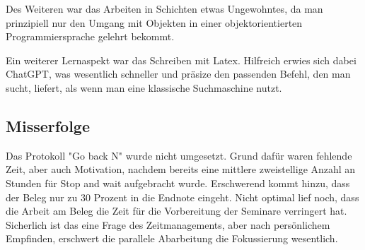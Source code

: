 \documentclass{article}
\begin{document}
Des Weiteren war das Arbeiten in Schichten etwas Ungewohntes, da man prinzipiell nur den Umgang mit Objekten in einer objektorientierten Programmiersprache gelehrt bekommt.  

Ein weiterer Lernaspekt war das Schreiben mit Latex. Hilfreich erwies sich dabei ChatGPT, was wesentlich schneller und präsize den passenden Befehl, den man sucht, liefert, als wenn man eine klassische Suchmaschine nutzt. 

\subsection{Misserfolge}
Das Protokoll "Go back N" wurde nicht umgesetzt. Grund dafür waren fehlende Zeit, aber auch Motivation, nachdem bereits eine mittlere zweistellige Anzahl an Stunden für Stop and wait aufgebracht wurde. Erschwerend kommt hinzu, dass der Beleg nur zu 30 Prozent in die Endnote eingeht. 
Nicht optimal lief noch, dass die Arbeit am Beleg die Zeit für die Vorbereitung der Seminare verringert hat. Sicherlich ist das eine Frage des Zeitmanagements, aber nach persönlichem Empfinden, erschwert die parallele Abarbeitung die Fokussierung wesentlich. 
\end{document}
